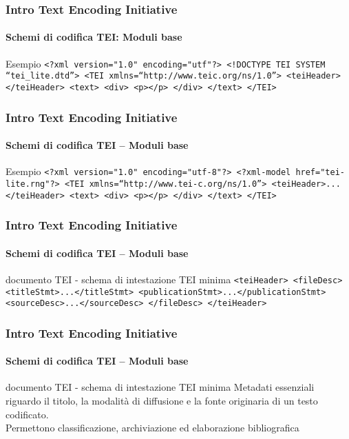\begin{frame}
	\frametitle{Intro Text Encoding Initiative}
	\framesubtitle{Schemi di codifica TEI:  Moduli base}
	\addtocounter{nframe}{1}

	\begin{block}{Esempio}
       \texttt{<?xml version="1.0" encoding="utf"?>
         <!DOCTYPE TEI SYSTEM ``tei\_lite.dtd''>
         <TEI xmlns=``http://www.tei\-c.org/ns/1.0''>
         <teiHeader> </teiHeader>
         <text>
             <div>
             <p></p>
             </div>
        </text>
        </TEI>}
    \end{block}
\end{frame}


\begin{frame}
	\frametitle{Intro Text Encoding Initiative}
	\framesubtitle{Schemi di codifica TEI – Moduli base}
	\addtocounter{nframe}{1}

	\begin{block}{Esempio}
        \texttt{<?xml version="1.0" encoding="utf-8"?>
        <?xml-model href="tei-lite.rng"?>
        <TEI xmlns=``http://www.tei-c.org/ns/1.0''>
        <teiHeader>...</teiHeader>
        <text>
        <div>
        <p></p>
        </div>
        </text>
        </TEI>}
    \end{block}
    
   

\end{frame}



\begin{frame}
	\frametitle{Intro Text Encoding Initiative}
	\framesubtitle{Schemi di codifica TEI – Moduli base}
	\addtocounter{nframe}{1}

	\begin{block}{documento TEI - schema di intestazione TEI minima}
        \texttt{<teiHeader>
        <fileDesc>
        <titleStmt>...</titleStmt>
        <publicationStmt>...</publicationStmt>
        <sourceDesc>...</sourceDesc>
        </fileDesc>
        </teiHeader>}
    \end{block}
    

\end{frame}


\begin{frame}
	\frametitle{Intro Text Encoding Initiative}
	\framesubtitle{Schemi di codifica TEI – Moduli base}
	\addtocounter{nframe}{1}

	\begin{block}{documento TEI - schema di intestazione TEI minima}
        Metadati essenziali riguardo il titolo, la modalità di diffusione e
        la fonte originaria di un testo codificato.
        \\Permettono classificazione, archiviazione ed elaborazione
        bibliografica
    \end{block}
    
\end{frame}



